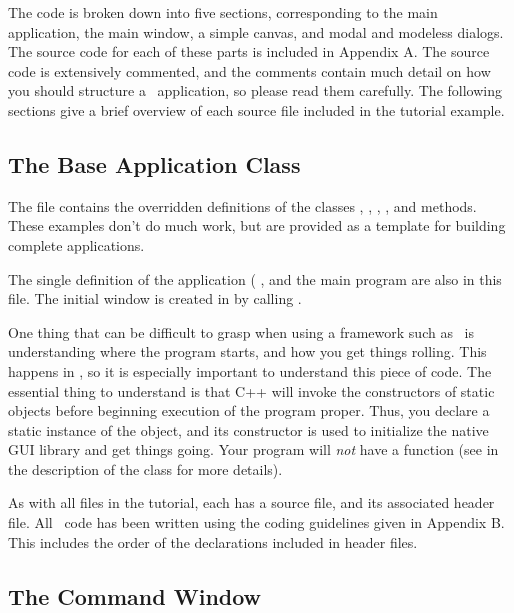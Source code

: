 The code is broken down into five sections, corresponding to the
main application, the main window, a simple canvas, and  modal
and modeless dialogs. The source code for each of these parts is
included in Appendix A. The source code is extensively commented,
and the comments contain much detail on how you should structure
a \V\ application, so please read them carefully. The following
sections give a brief overview of each source file included in
the tutorial example.

\subsection*{The Base Application Class}

The file  contains the overridden definitions of
the classes , , ,
, and  methods. These examples
don't do much work, but are provided as a template for building
complete applications.

The single definition of the application ( 
, and the  main program
are also in this file. The initial window is created in 
by calling .

One thing that can be difficult to grasp when using a
framework such as \V\ is understanding where the program starts,
and how you get things rolling. This happens in ,
so it is especially important to understand this piece of code.
The essential thing to understand is that C++ will invoke the
constructors of static objects before beginning execution of the
program proper. Thus, you declare a static instance of the
 object, and its constructor is used to initialize the
native GUI library and get things going. Your program will
\emph{not} have a  function (see  in the
description of the  class for more details).

As with all files in the tutorial, each has a  source
file, and its associated  header file. All \V\ code has
been written using the coding guidelines given in Appendix B.
This includes the order of the declarations included in header
files.


\subsection*{The Command Window}

